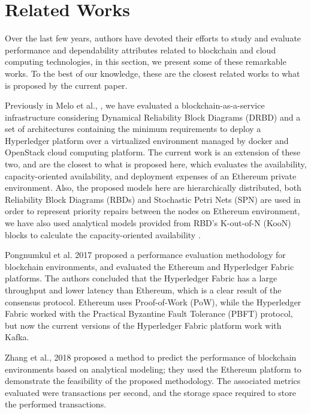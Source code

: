\section{Related Works}
\label{sec:rltd}
Over the last few years, authors have devoted their efforts to study and evaluate performance and dependability attributes related to blockchain and cloud computing technologies, in this section, we present some of these remarkable works. To the best of our knowledge, these are the closest related works to what is proposed by the current paper.

Previously in Melo et al., \cite{melo2018dependability,melo2019}, we have evaluated a blockchain-as-a-service infrastructure considering Dynamical Reliability Block Diagrams (DRBD) and a set of architectures containing the minimum requirements to deploy a Hyperledger platform over a virtualized environment managed by docker and OpenStack cloud computing platform. The current work is an extension of these two, and are the closest to what is proposed here, which evaluates the availability, capacity-oriented availability, and deployment expenses of an Ethereum private environment. Also, the proposed models here are hierarchically distributed, both Reliability Block Diagrams (RBDs) and Stochastic Petri Nets (SPN) are used in order to represent priority repairs between the nodes on Ethereum environment, we have also used analytical models provided from RBD's K-out-of-N (KooN) blocks to calculate the capacity-oriented availability \cite{paulo2011,MartinsMaciel2016}.

Pongnumkul et al. 2017 \cite{pongnumkul2017performance} proposed a performance evaluation methodology for blockchain environments, and evaluated the Ethereum and Hyperledger Fabric platforms. The authors concluded that the Hyperledger Fabric has a large throughput and lower latency than Ethereum, which is a clear result of the consensus protocol. Ethereum uses Proof-of-Work (PoW), while the Hyperledger Fabric worked with the Practical Byzantine Fault Tolerance (PBFT) protocol, but now the current versions of the Hyperledger Fabric platform work with Kafka.

Zhang et al., 2018 \cite{zhang2018method} proposed a method to predict the performance of blockchain environments based on analytical modeling; they used the Ethereum platform to demonstrate the feasibility of the proposed methodology. The associated metrics evaluated were transactions per second, and the storage space required to store the performed transactions. 

